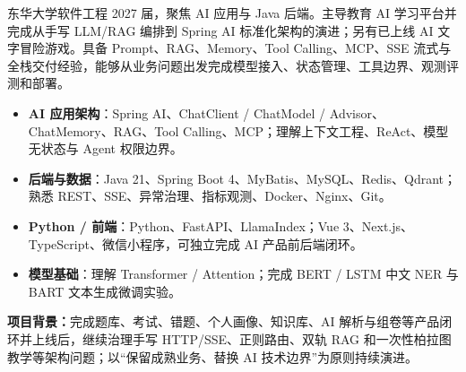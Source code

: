 东华大学软件工程 2027 届，聚焦 AI 应用与 Java 后端。主导教育 AI 学习平台并完成从手写 LLM/RAG 编排到 Spring AI 标准化架构的演进；另有已上线 AI 文字冒险游戏。具备 Prompt、RAG、Memory、Tool Calling、MCP、SSE 流式与全栈交付经验，能够从业务问题出发完成模型接入、状态管理、工具边界、观测评测和部署。

\begin{itemize}[parsep=0.35ex]
  \item \textbf{AI 应用架构}：Spring AI、ChatClient / ChatModel / Advisor、ChatMemory、RAG、Tool Calling、MCP；理解上下文工程、ReAct、模型无状态与 Agent 权限边界。
  \item \textbf{后端与数据}：Java 21、Spring Boot 4、MyBatis、MySQL、Redis、Qdrant；熟悉 REST、SSE、异常治理、指标观测、Docker、Nginx、Git。
  \item \textbf{Python / 前端}：Python、FastAPI、LlamaIndex；Vue 3、Next.js、TypeScript、微信小程序，可独立完成 AI 产品前后端闭环。
  \item \textbf{模型基础}：理解 Transformer / Attention；完成 BERT / LSTM 中文 NER 与 BART 文本生成微调实验。
\end{itemize}



\textbf{项目背景：}完成题库、考试、错题、个人画像、知识库、AI 解析与组卷等产品闭环并上线后，继续治理手写 HTTP/SSE、正则路由、双轨 RAG 和一次性柏拉图教学等架构问题；以“保留成熟业务、替换 AI 技术边界”为原则持续演进。

